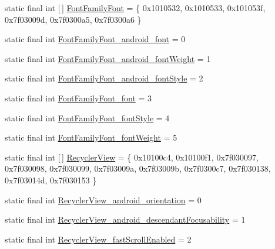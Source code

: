 \begin{DoxyCompactItemize}
\item 
static final int \mbox{[}$\,$\mbox{]} \mbox{\hyperlink{classandroid_1_1support_1_1v7_1_1recyclerview_1_1_r_1_1styleable_a05b9428fa9f3333f27238fa913cc25c7}{Font\+Family\+Font}} = \{ 0x1010532, 0x1010533, 0x101053f, 0x7f03009d, 0x7f0300a5, 0x7f0300a6 \}
\item 
static final int \mbox{\hyperlink{classandroid_1_1support_1_1v7_1_1recyclerview_1_1_r_1_1styleable_a700667c1ed0d43c45f377e7e0e2f2aac}{Font\+Family\+Font\+\_\+android\+\_\+font}} = 0
\item 
static final int \mbox{\hyperlink{classandroid_1_1support_1_1v7_1_1recyclerview_1_1_r_1_1styleable_af39a482c92a40bb0ba186bfac074597d}{Font\+Family\+Font\+\_\+android\+\_\+font\+Weight}} = 1
\item 
static final int \mbox{\hyperlink{classandroid_1_1support_1_1v7_1_1recyclerview_1_1_r_1_1styleable_a06c875c549fe0b50bfb75b555e87f30a}{Font\+Family\+Font\+\_\+android\+\_\+font\+Style}} = 2
\item 
static final int \mbox{\hyperlink{classandroid_1_1support_1_1v7_1_1recyclerview_1_1_r_1_1styleable_a6a6fd786ff1b8154e6f5f1d7a7246be4}{Font\+Family\+Font\+\_\+font}} = 3
\item 
static final int \mbox{\hyperlink{classandroid_1_1support_1_1v7_1_1recyclerview_1_1_r_1_1styleable_ac32bf5e4b347124959bfbca6000b13fe}{Font\+Family\+Font\+\_\+font\+Style}} = 4
\item 
static final int \mbox{\hyperlink{classandroid_1_1support_1_1v7_1_1recyclerview_1_1_r_1_1styleable_a62c034f5e14d7f852095bb1f265f619a}{Font\+Family\+Font\+\_\+font\+Weight}} = 5
\item 
static final int \mbox{[}$\,$\mbox{]} \mbox{\hyperlink{classandroid_1_1support_1_1v7_1_1recyclerview_1_1_r_1_1styleable_a04a899c7c67238649fa8d1612c23cf52}{Recycler\+View}} = \{ 0x10100c4, 0x10100f1, 0x7f030097, 0x7f030098, 0x7f030099, 0x7f03009a, 0x7f03009b, 0x7f0300c7, 0x7f030138, 0x7f03014d, 0x7f030153 \}
\item 
static final int \mbox{\hyperlink{classandroid_1_1support_1_1v7_1_1recyclerview_1_1_r_1_1styleable_add9c53341d0d0e7b55bb93b15daeb562}{Recycler\+View\+\_\+android\+\_\+orientation}} = 0
\item 
static final int \mbox{\hyperlink{classandroid_1_1support_1_1v7_1_1recyclerview_1_1_r_1_1styleable_a86aa1de708a59c3626e522e8e4f22d0f}{Recycler\+View\+\_\+android\+\_\+descendant\+Focusability}} = 1
\item 
static final int \mbox{\hyperlink{classandroid_1_1support_1_1v7_1_1recyclerview_1_1_r_1_1styleable_a16a1a8ea204cdc15596be047da604579}{Recycler\+View\+\_\+fast\+Scroll\+Enabled}} = 2

\end{DoxyCompactItemize}
